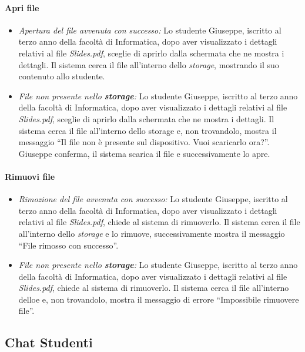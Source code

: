 \paragraph{Apri file}
\begin{itemize}
	\item \textit{Apertura del file avvenuta con successo:}
	Lo studente Giuseppe, iscritto al terzo anno della facoltà di Informatica, dopo aver visualizzato i dettagli relativi al file \textit{Slides.pdf}, sceglie di aprirlo dalla schermata che ne mostra i dettagli. Il sistema cerca il file all'interno dello \textit{storage}, mostrando il suo contenuto allo studente.
	
	\item \textit{File non presente nello \textbf{storage}:}
	Lo studente Giuseppe, iscritto al terzo anno della facoltà di Informatica, dopo aver visualizzato i dettagli relativi al file \textit{Slides.pdf}, sceglie di aprirlo dalla schermata che ne mostra i dettagli. Il sistema cerca il file all'interno dello storage e, non trovandolo, mostra il messaggio “Il file non è presente sul dispositivo. Vuoi scaricarlo ora?”. Giuseppe conferma, il sistema scarica il file e successivamente lo apre.
\end{itemize}

\paragraph{Rimuovi file}
\begin{itemize}
	\item \textit{Rimozione del file avvenuta con successo:}
	Lo studente Giuseppe, iscritto al terzo anno della facoltà di Informatica, dopo aver visualizzato i dettagli relativi al file \textit{Slides.pdf}, chiede al sistema di rimuoverlo. Il sistema cerca il file all'interno dello \textit{storage} e lo rimuove, successivamente mostra il messaggio “File rimosso con successo”.
	
	\item \textit{File non presente nello \textbf{storage}:}
	Lo studente Giuseppe, iscritto al terzo anno della facoltà di Informatica, dopo aver visualizzato i dettagli relativi al file \textit{Slides.pdf}, chiede al sistema di rimuoverlo. Il sistema cerca il file all'interno delloe e, non trovandolo, mostra il messaggio di errore “Impossibile rimuovere file”.
\end{itemize}


\subsection{Chat Studenti}
